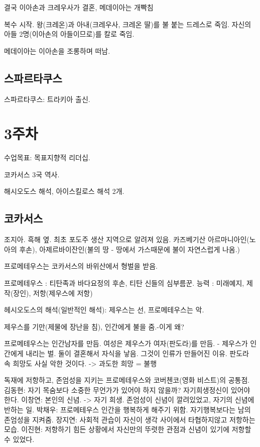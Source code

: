 결국 이아손과 크레우사가 결혼, 메데이아는 개빡침 

복수 시작. 왕(크레온)과 아내(크레우사, 크레온 딸)를 불 붙는 드레스로 죽임. 
자신의 아들 2명(이아손의
아들이므로)를 칼로 죽임.

메데이아는 이아손을 조롱하며 떠남.

\subsection{스파르타쿠스}
스파르타쿠스: 트라키아 출신.

\section{3주차}

수업목표: 목표지향적 리더십.

코카서스 3국 역사.

해시오도스 해석, 아이스킬로스 해석 2개.

\subsection{코카서스}
조지아. 흑해 옆. 최초 포도주 생산 지역으로 알려져 있음. 카즈베기산
아르마니아인(노아의 후손), 아제르바이잔인(불의 땅 - 땅에서 가스때문에 불이 자연스럽게 나옴.)

프로메테우스는 코카서스의 바위산에서 형벌을 받음.

프로메테우스 : 티탄족과 바다요정의 후손, 티탄 신들의 심부름꾼.
능력 : 미래예지, 제작(장인), 저항(제우스에 저항)

헤시오도스의 해석(일반적인 해석): 제우스는 선, 프로메테우스는 악.

제우스를 기만(제물에 장난을 침), 인간에게 불을 줌.-이게 왜? 

프로메테우스는 인간남자를 만듬. 여성은 제우스가 여자(판도라)를 만듬. - 제우스가 인간에게 내리는 벌.
둘이 결혼해서 자식을 낳음. 그것이 인류가 만들어진 이유.
판도라 속 희망도 사실 악한 것이다. -> 과도한 희망 = 불행

독재에 저항하고, 존엄성을 지키는 프로메테우스와 코버첸코(영화 비스트)의 공통점.
김동현: 자기 목숨보다 소중한 무언가가 있어야 하지 않을까? 자기희생정신이 있어야 한다.
이창연: 본인의 신념. -> 자기 희생. 존엄성이 신념이 깔려있었고, 자기의 신념에 반하는 일.
박채우: 프로메테우스 인간을 행복하게 해주기 위함. 자기행복보다는 남의 존엄성을 지켜줌.
장지연: 사회적 관습이 자신이 생각 사이에서 타협하지않고 저항하는 모습.
이진현: 저항하기 힘든 상황에서 자신만의 뚜렷한 관점과 신념이 있기에 저항할 수 있었다.

